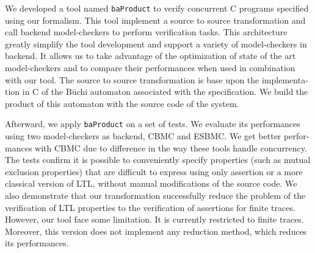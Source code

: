 \begin{otherlanguage}{english}
We developed a tool named \texttt{baProduct} to verify concurrent C programs
specified using our formalism. This tool implement a source to source
transformation and call backend model-checkers to perform verification tasks.
This architecture greatly simplify the tool development and support a
variety of model-checkers in backend. It allows us to take advantage of the
optimization of state of the art model-checkers and to compare their
performances when used in combination with our tool.
The source to source transformation is base upon the implementation in C of the
Büchi automaton associated with the specification. We build the product of this
automaton with the source code of the system.

Afterward, we apply \texttt{baProduct} on a set of tests. We evaluate its
performances using two model-checkers as backend, CBMC and ESBMC. We get better
performances with CBMC due to difference in the way these tools handle
concurrency. The tests confirm it is possible to conveniently specify properties
(such as mutual exclusion properties) that are difficult to express using only
assertion or a more classical version of LTL, without manual modifications of
the source code. We also demonstrate that our transformation successfully reduce
the problem of the verification of LTL properties to the verification of
assertions for finite traces. However, our tool face some limitation. It is
currently restricted to finite traces. Moreover, this version does not
implement any reduction method, which reduces its performances.

\end{otherlanguage}

